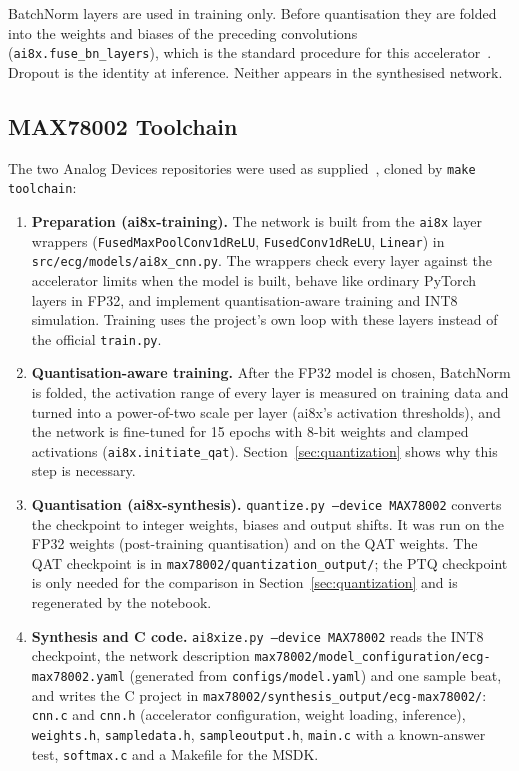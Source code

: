 BatchNorm layers are used in training only. Before quantisation they are folded into the weights and biases of the preceding convolutions (\texttt{ai8x.fuse\_bn\_layers}), which is the standard procedure for this accelerator~\cite{jacob2018quantization}. Dropout is the identity at inference. Neither appears in the synthesised network.

\subsection{MAX78002 Toolchain}
\label{sec:toolchain}

The two Analog Devices repositories were used as supplied~\cite{ai8xtraining,ai8xsynthesis}, cloned by \texttt{make toolchain}:

\begin{enumerate}[nosep]
  \item \textbf{Preparation (ai8x-training).} The network is built from the \texttt{ai8x} layer wrappers (\texttt{FusedMaxPoolConv1dReLU}, \texttt{FusedConv1dReLU}, \texttt{Linear}) in \texttt{src/ecg/models/ai8x\_cnn.py}. The wrappers check every layer against the accelerator limits when the model is built, behave like ordinary PyTorch layers in FP32, and implement quantisation-aware training and INT8 simulation. Training uses the project's own loop with these layers instead of the official \texttt{train.py}.
  \item \textbf{Quantisation-aware training.} After the FP32 model is chosen, BatchNorm is folded, the activation range of every layer is measured on training data and turned into a power-of-two scale per layer (ai8x's activation thresholds), and the network is fine-tuned for 15 epochs with 8-bit weights and clamped activations (\texttt{ai8x.initiate\_qat}). Section~\ref{sec:quantization} shows why this step is necessary.
  \item \textbf{Quantisation (ai8x-synthesis).} \texttt{quantize.py --device MAX78002} converts the checkpoint to integer weights, biases and output shifts. It was run on the FP32 weights (post-training quantisation) and on the QAT weights. The QAT checkpoint is in \texttt{max78002/quantization\_output/}; the PTQ checkpoint is only needed for the comparison in Section~\ref{sec:quantization} and is regenerated by the notebook.
  \item \textbf{Synthesis and C code.} \texttt{ai8xize.py --device MAX78002} reads the INT8 checkpoint, the network description \texttt{max78002/model\_configuration/ecg-max78002.yaml} (generated from \texttt{configs/model.yaml}) and one sample beat, and writes the C project in \texttt{max78002/synthesis\_output/ecg-max78002/}: \texttt{cnn.c} and \texttt{cnn.h} (accelerator configuration, weight loading, inference), \texttt{weights.h}, \texttt{sampledata.h}, \texttt{sampleoutput.h}, \texttt{main.c} with a known-answer test, \texttt{softmax.c} and a Makefile for the MSDK.
\end{enumerate}

